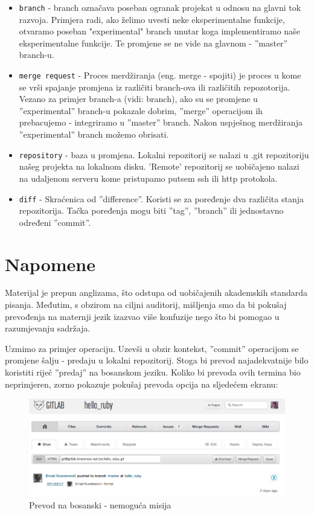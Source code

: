 \documentclass[times, utf8, seminar]{fit}
\begin{document}
\begin{itemize}
\begin{itemize}
    \item \texttt{branch} - branch označava poseban ogranak projekat u odnosu na glavni tok razvoja. Primjera radi, ako želimo uvesti neke eksperimentalne funkcije, otvaramo poseban "experimental" branch unutar koga implementiramo naše eksperimentalne funkcije. Te promjene se ne vide na glavnom - ''master'' branch-u.
    \item \texttt{merge request} - Proces merdžiranja (eng. merge - spojiti) je proces u kome se vrši spajanje promjena iz različiti branch-ova ili različitih repozotorija. Vezano za primjer branch-a (vidi: branch), ako su se promjene u ''experimental'' branch-u pokazale dobrim, ''merge'' operacijom ih prebacujemo - integriramo u ''master'' branch. Nakon uspješnog merdžiranja ''experimental'' branch možemo obrisati.
    \item \texttt{repository} - baza u promjena. Lokalni repozitorij se nalazi u .git repozitoriju našeg projekta na lokalnom disku. 'Remote' repozitorij se uobičajeno nalazi na udaljenom serveru kome pristupamo putsem ssh ili http protokola.
    \item \texttt{diff} - Skraćenica od ''difference''. Koristi se za poređenje dva različita stanja repozitorija. Tačka poređenja mogu biti ''tag'', ''branch'' ili jednostavno određeni ''commit''.
\end{itemize}

\chapter{Napomene}

Materijal je prepun anglizama, što odstupa od uobičajenih akademskih standarda pisanja. Međutim, s obzirom na ciljni auditorij, mišljenja smo da bi pokušaj prevođenja na maternji jezik izazvao više konfuzije nego što bi pomogao u razumjevanju sadržaja.

Uzmimo za primjer \href{http://translate.google.com/#en/hr/commit}{\color{blue}{''commit''}} operaciju.
Uzevši u obzir kontekst, ''commit'' operacijom se promjene šalju - predaju u lokalni repozitorij.
Stoga bi prevod najadekvatnije bilo koristiti riječ ''predaj'' na bosanskom jeziku.
Koliko bi prevoda ovih termina bio neprimjeren, zorno pokazuje pokušaj prevoda opcija na sljedećem ekranu:

\begin{figure}[H]
\centering
\includegraphics[width=14cm]{img/cik_prevedi.png}
\caption{Prevod na bosanski - nemoguća misija}
\end{figure}


\end{itemize}
\end{document}
